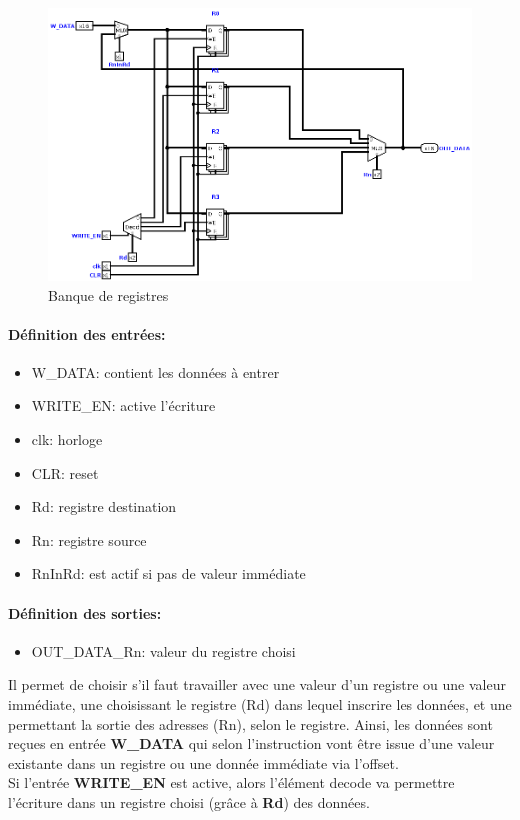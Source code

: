 \documentclass[a4paper]{article} %
\begin{document}
\begin{figure}[H]
    \centering
    \includegraphics[width=.8\textwidth]{src/REGISTERS_16BITS.png}
    \caption{Banque de registres}
    \label{regi16_img}
\end{figure}



\paragraph{Définition des entrées:}
\begin{itemize}
    \item     W\_DATA: contient les données à entrer
    \item     WRITE\_EN: active l'écriture
    \item     clk: horloge
    \item     CLR: reset
    \item     Rd: registre destination
    \item     Rn: registre source
    \item     RnInRd: est actif si pas de valeur immédiate
\end{itemize}
\paragraph{Définition des sorties:}
\begin{itemize}
    \item OUT\_DATA\_Rn: valeur du registre choisi
\end{itemize}

\medskip
Il permet de choisir s'il faut travailler avec une valeur d'un registre ou une valeur immédiate, une choisissant le registre (Rd) dans lequel inscrire les données, et une permettant la sortie des adresses (Rn), selon le registre.
Ainsi, les données sont reçues en entrée \textbf{W\_DATA} qui selon l'instruction vont être issue d'une valeur existante dans un registre ou une donnée immédiate via l'offset. 
\\Si l'entrée \textbf{WRITE\_EN} est active, alors l'élément decode va permettre l'écriture dans un registre choisi (grâce à \textbf{Rd}) des données.
\end{document}
